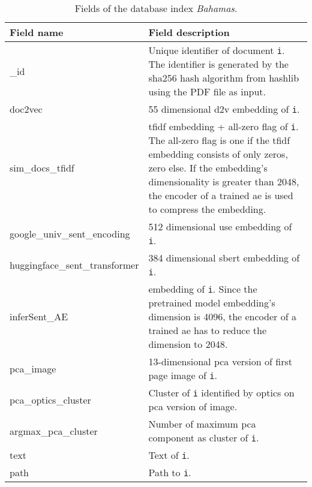 \begin{table}[]
    \caption{Fields of the \databaseName{} database index \textit{Bahamas}.}
    \begin{tabular}{|
    >{\columncolor[HTML]{EFEFEF}}l |p{}|}
    \hline
    \cellcolor[HTML]{C0C0C0}\textbf{Field name} & \cellcolor[HTML]{C0C0C0}\textbf{Field description}                                     \\ \hline
    \_id                                        & Unique identifier of document \texttt{i}. The identifier is generated by the sha256 hash algorithm from hashlib using the PDF file as input.\\ \hline
    doc2vec                                     & 55 dimensional \ac{d2v} embedding of \texttt{i}.                                                          \\ \hline
    sim\_docs\_tfidf                            & \ac{tfidf} embedding + all-zero flag of \texttt{i}. The all-zero flag is one if the \ac{tfidf} embedding consists of only zeros, zero else. If the embedding's dimensionality is greater than 2048, the encoder of a trained \ac{ae} is used to compress the embedding.\\ \hline
    google\_univ\_sent\_encoding                & 512 dimensional \ac{use} embedding of \texttt{i}.                                     \\ \hline
    huggingface\_sent\_transformer              & 384 dimensional \ac{sbert} embedding of \texttt{i}.                                  \\ \hline
    inferSent\_AE                               & \infersent{} embedding of \texttt{i}. Since the pretrained \infersent{} model embedding's dimension is 4096, the encoder of a trained \ac{ae} has to reduce the dimension to 2048.                                                    \\ \hline
    pca\_image                                  & 13-dimensional \ac{pca} version of first page image of \texttt{i}.                      \\ \hline
    pca\_optics\_cluster                        & Cluster of \texttt{i} identified by \acs{optics} on \ac{pca} version of image.            \\ \hline
    argmax\_pca\_cluster                        & Number of maximum \ac{pca} component as cluster of \texttt{i}.                            \\ \hline
    text                                        & Text of \texttt{i}.                                                                       \\ \hline
    path                                        & Path to \texttt{i}.                                                     \\ \hline
    \end{tabular}
    \label{tbl:Elasticsearch-fields}
\end{table}

